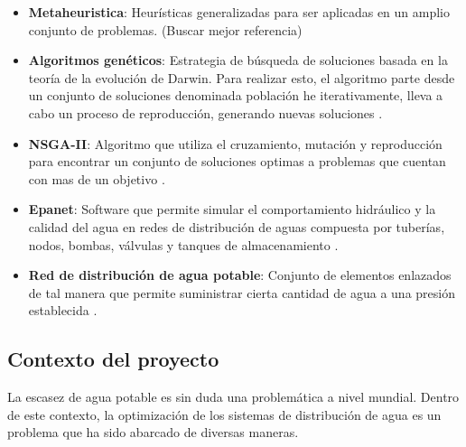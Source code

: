\documentclass[11pt,letterpaper]{article}
\begin{document}
\begin{itemize}
\item \textbf{Metaheuristica}: Heurísticas generalizadas para ser aplicadas en un amplio conjunto de problemas. (Buscar mejor referencia)

\item \textbf{Algoritmos genéticos}: Estrategia de búsqueda de soluciones basada en la teoría de la evolución de Darwin. Para realizar esto, el algoritmo  parte desde un conjunto de soluciones denominada población he iterativamente, lleva a cabo un proceso de reproducción, generando nuevas soluciones \cite{Heiss-Czedik1997}.

\item \textbf{NSGA-II}: Algoritmo que utiliza el cruzamiento, mutación y reproducción para encontrar un conjunto de soluciones optimas a problemas que cuentan con mas de un objetivo \cite{Deb2002}. 

\item \textbf{Epanet}: Software que permite simular el comportamiento hidráulico y la calidad del agua en redes de distribución de aguas compuesta por tuberías, nodos, bombas, válvulas y tanques de almacenamiento \cite{Rossman2017}. 
\item \textbf{Red de distribución de agua potable}: Conjunto de elementos enlazados de tal manera que permite suministrar cierta cantidad de agua a una presión establecida \cite{Doctoral2012}.
 
\end{itemize}

\subsection{Contexto del proyecto} 

La escasez de agua potable es sin duda una problemática a nivel mundial. Dentro de este contexto, la optimización de los sistemas de distribución de agua es un problema que ha sido abarcado de diversas maneras.
\end{document}
